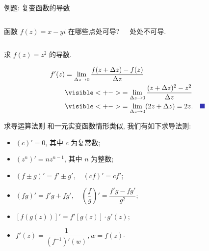\begin{frame}[<*>]{例题: 复变函数的导数}
\beqskip{4pt}
\onslide<+->
\begin{columns}
		\begin{exercise}
		函数 $f(z)=x-yi$ 在哪些点处可导? 
		\end{exercise}\onslide<+->
		\begin{answer}
		处处不可导.\\
		\vphantom{$f(z)=x-yi$ 在}
		\end{answer}
\end{columns}
\onslide<+->
\begin{example}
求 $f(z)=z^2$ 的导数.
\end{example}
\onslide<+->
\begin{solutions}
\vspace{-\baselineskip}
\begin{align*}
f'(z)&=\lim_{\Delta z\to 0}\frac{f(z+\Delta z)-f(z)}{\Delta z}\\
&\visible<+->{=\lim_{\Delta z\to 0}\frac{(z+\Delta z)^2-z^2}{\Delta z}}\\
&\visible<+->{=\lim_{\Delta z\to 0}(2z+\Delta z)=2z.\mqed}
\end{align*}
\end{solutions}
\endgroup
\end{frame}


\begin{frame}{求导运算法则}
\onslide<+->
和一元实变函数情形类似, 我们有如下求导法则:
\begin{theorem}
\begin{itemize}
\item $(c)'=0$, 其中 $c$ 为复常数;
\item $(z^n)'=nz^{n-1}$, 其中 $n$ 为整数;
\item $(f\pm g)'=f'\pm g',\quad (cf)'=cf'$;
\item $(fg)'=f'g+fg',\quad \left(\dfrac fg\right)'=\dfrac{f'g-fg'}{g^2}$;
\item $[f(g(z))]'=f'[g(z)]\cdot g'(z)$;
\item $f'(z)=\dfrac1{(f^{-1})'(w)}, w=f(z)$.
\end{itemize}
\end{theorem}
\end{frame}


